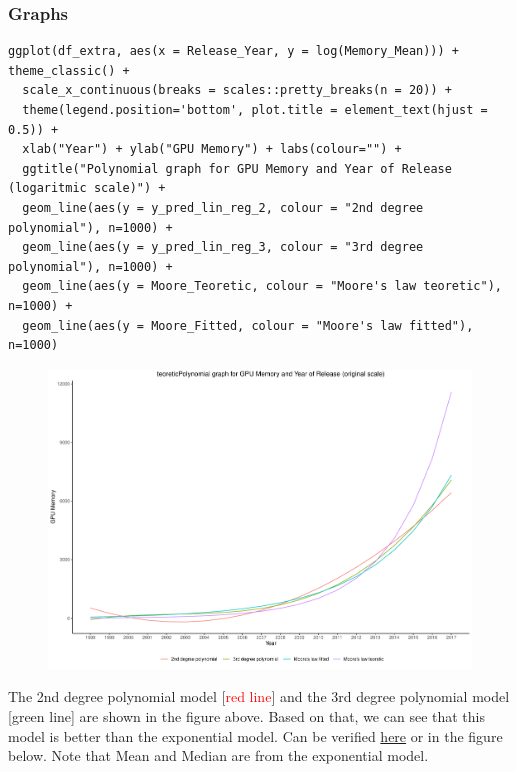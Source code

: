 \documentclass[a4paper]{article}
\begin{document}
\subsubsection{Graphs}
\begin{mdframed}[leftline=false,rightline=false,backgroundcolor=lightblue!10,nobreak=false]
    \begin{verbatim}
ggplot(df_extra, aes(x = Release_Year, y = log(Memory_Mean))) +  theme_classic() +
  scale_x_continuous(breaks = scales::pretty_breaks(n = 20)) +
  theme(legend.position='bottom', plot.title = element_text(hjust = 0.5)) +
  xlab("Year") + ylab("GPU Memory") + labs(colour="") + 
  ggtitle("Polynomial graph for GPU Memory and Year of Release (logaritmic scale)") + 
  geom_line(aes(y = y_pred_lin_reg_2, colour = "2nd degree polynomial"), n=1000) + 
  geom_line(aes(y = y_pred_lin_reg_3, colour = "3rd degree polynomial"), n=1000) +
  geom_line(aes(y = Moore_Teoretic, colour = "Moore's law teoretic"), n=1000) +
  geom_line(aes(y = Moore_Fitted, colour = "Moore's law fitted"), n=1000) 
    \end{verbatim}
\end{mdframed}
\begin{figure}[H]
    \centering
    \includegraphics[keepaspectratio, width=1\textwidth, height=1\textheight]{EM/poly.pdf}
\end{figure}
The 2nd degree polynomial model [\textcolor{red}{red line}] and the 3rd degree polynomial model  [\textcolor{mygreen}{green line}] are shown in the figure above. Based on that, we can see that this model is better than the exponential model. Can be verified \href{https://colab.research.google.com/drive/1ixVXEsUy2YtcCrayuPR6mmMf80pT92nh#scrollTo=vRHmN6RtiXz5}{here} or in the figure below. Note that Mean and Median are from the exponential model.\\\\
\end{document}
